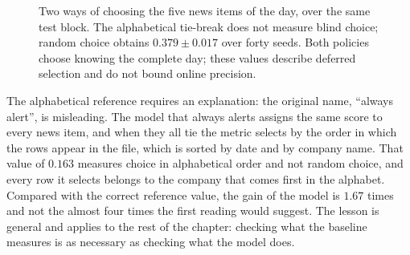 \begin{figure}[htbp]
\centering
{}
\caption[The alphabetical tie-break is not a random reference]{Two ways of choosing the five news
items of the day, over the same test block. The alphabetical tie-break does not measure blind
choice; random choice obtains $0.379 \pm 0.017$ over forty seeds. Both policies choose knowing the
complete day; these values describe deferred selection and do not bound online precision.}
\label{fig:av_orcamento}
\end{figure}

The alphabetical reference requires an explanation: the original name, ``always alert'', is
misleading. The model that always alerts assigns the same score to every news item, and when they
all tie the metric selects by the order in which the rows appear in the file, which is sorted by
date and by company name. That value of $0.163$ measures choice in alphabetical order and not
random choice, and every row it selects belongs to the company that comes first in the alphabet.
Compared with the correct reference value, the gain of the model is $1.67$ times and not the almost
four times the first reading would suggest. The lesson is general and applies to the rest of the
chapter: checking what the baseline measures is as necessary as checking what the model does.

